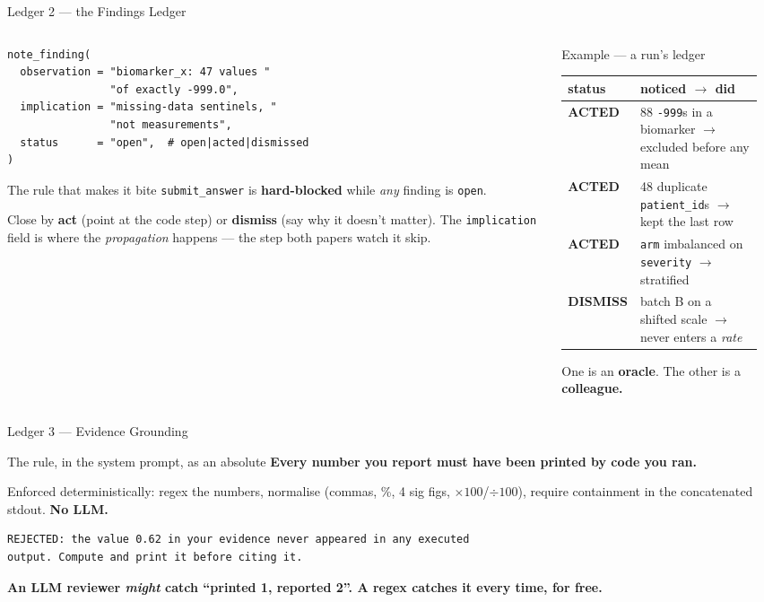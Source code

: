 \documentclass[9pt,aspectratio=169]{beamer}
\newcommand{\gd}[1]{\textcolor{unigreen}{\textbf{#1}}}
\newcommand{\sm}[1]{{\color{unigrey}\small #1}}
\newcommand{\code}[1]{\texttt{\small #1}}
\begin{document}
\begin{frame}[fragile]{Ledger 2 --- the Findings Ledger}
\begin{columns}[T]
\begin{column}{0.5\textwidth}
\begin{lstlisting}
note_finding(
  observation = "biomarker_x: 47 values "
                "of exactly -999.0",
  implication = "missing-data sentinels, "
                "not measurements",
  status      = "open",  # open|acted|dismissed
)
\end{lstlisting}
\begin{alertblock}{The rule that makes it bite}
\centering
\code{submit\_answer} is \textbf{hard-blocked} while \emph{any} finding is \code{open}.
\end{alertblock}
\smallskip
\sm{Close by \gd{act} (point at the code step) or \textbf{dismiss} (say why it doesn't matter). The
\code{implication} field is where the \emph{propagation} happens --- the step both papers watch it skip.}
\end{column}
\begin{column}{0.5\textwidth}
\begin{block}{Example --- a run's ledger}
\centering\scriptsize
\begin{tabular}{@{}p{0.20\linewidth}p{0.70\linewidth}@{}}
\toprule
\textbf{status} & \textbf{noticed $\to$ did} \\
\midrule
\gd{ACTED} & 88 \code{-999}s in a biomarker $\to$ excluded before any mean \\
\gd{ACTED} & 48 duplicate \code{patient\_id}s $\to$ kept the last row \\
\gd{ACTED} & \code{arm} imbalanced on \code{severity} $\to$ stratified \\
\textcolor{unigrey}{\textbf{DISMISS}} & batch B on a shifted scale $\to$ never enters a \emph{rate} \\
\bottomrule
\end{tabular}
\end{block}
\smallskip
\centering One is an \textbf{oracle}. The other is a \textbf{colleague.}
\end{column}
\end{columns}
\end{frame}

\begin{frame}[fragile]{Ledger 3 --- Evidence Grounding}
\begin{block}{The rule, in the system prompt, as an absolute}
\centering\textbf{Every number you report must have been printed by code you ran.}
\end{block}
\medskip
Enforced deterministically: regex the numbers, normalise \sm{(commas, \%, 4 sig figs, $\times100$/$\div100$)},
require containment in the concatenated stdout. \textbf{No LLM.}
\medskip
\begin{lstlisting}
REJECTED: the value 0.62 in your evidence never appeared in any executed
output. Compute and print it before citing it.
\end{lstlisting}
\vfill
\centering\textbf{An LLM reviewer \emph{might} catch ``printed 1, reported 2''. A regex catches it every time, for free.}
\end{frame}
\end{document}
